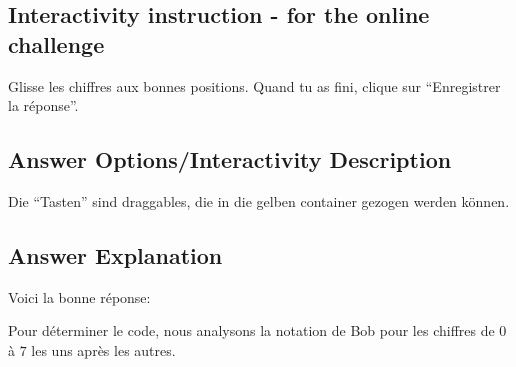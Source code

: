 \documentclass[a4paper,11pt]{report}
\newcommand{\taskGraphicsFolder}{..}
\begin{document}
\subsection*{Interactivity instruction - for the online challenge}

Glisse les chiffres aux bonnes positions. Quand tu as fini, clique sur “Enregistrer la réponse”.

\begingroup
\renewcommand{\arraystretch}{1.5}
\subsection*{Answer Options/Interactivity Description}

Die “Tasten” sind draggables, die in die gelben container gezogen werden können.

\endgroup

\subsection*{Answer Explanation}

Voici la bonne réponse:

{\centering%
\par}

Pour déterminer le code, nous analysons la notation de Bob pour les chiffres de $0$ à $7$ les uns après les autres.
\end{document}
